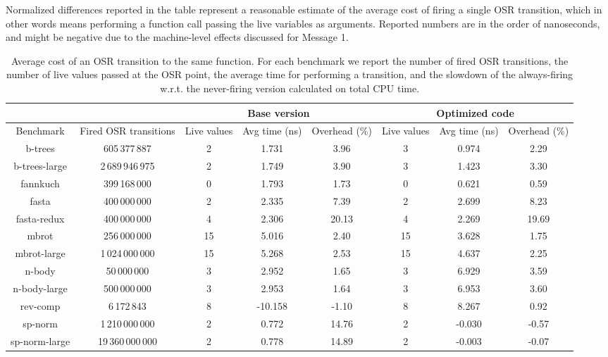 Normalized differences reported in the table represent a reasonable estimate of the average cost of firing a single OSR transition, which in other words means performing a function call passing the live variables as arguments. Reported numbers are in the order of nanoseconds, and might be negative due to the machine-level effects discussed for Message 1.

\begin{table} 
\begin{center}
\begin{small}
    \begin{tabular}{ |c|c|c|c|c|c|c|c| }
        \cline{3-8}
        \multicolumn{2}{c|}{} & \multicolumn{3}{c|}{Base version} & \multicolumn{3}{c|}{Optimized code} \\
        \hline
        Benchmark & Fired OSR transitions & Live values & Avg time (ns) & Overhead (\%) & Live values & Avg time (ns) & Overhead (\%) \\ 
        \hline
        \hline
        b-trees & 605\,377\,887 & 2 & 1.731 & 3.96 & 3 & 0.974 & 2.29 \\ 
        \hline
        b-trees-large & 2\,689\,946\,975 & 2 & 1.749 & 3.90 & 3 & 1.423 & 3.30 \\ 
        \hline
        fannkuch & 399\,168\,000 & 0 & 1.793 & 1.73 & 0 & 0.621 & 0.59 \\ 
        \hline
        fasta & 400\,000\,000 & 2 & 2.335 & 7.39 & 2 & 2.699 & 8.23 \\ 
        \hline
        fasta-redux & 400\,000\,000 & 4 & 2.306 & 20.13 & 4 & 2.269 & 19.69 \\ 
        \hline
        mbrot & 256\,000\,000 & 15 & 5.016 & 2.40 & 15 & 3.628 & 1.75 \\ 
        \hline
        mbrot-large & 1\,024\,000\,000 & 15 & 5.268 & 2.53 & 15 & 4.637 & 2.25 \\ 
        \hline
        n-body & 50\,000\,000 & 3 & 2.952 & 1.65 & 3 & 6.929 & 3.59 \\ 
        \hline
        n-body-large & 500\,000\,000 & 3 & 2.953 & 1.64 & 3 & 6.953 & 3.60 \\ 
        \hline
        rev-comp & 6\,172\,843 & 8 & -10.158 & -1.10 & 8 & 8.267 & 0.92 \\ 
        \hline
        sp-norm & 1\,210\,000\,000 & 2 & 0.772 & 14.76 & 2 & -0.030 & -0.57 \\ 
        \hline 
        sp-norm-large & 19\,360\,000\,000 & 2 & 0.778 & 14.89 & 2 & -0.003 & -0.07 \\
        \hline
    \end{tabular} 
\end{small}
\end{center}
\caption{\label{tab:sameFun}Average cost of an OSR transition to the same function. For each benchmark we report the number of fired OSR transitions, the number of live values passed at the OSR point, the average time for performing a transition, and the slowdown of the always-firing w.r.t. the never-firing version calculated on total CPU time. } 
\end{table}

